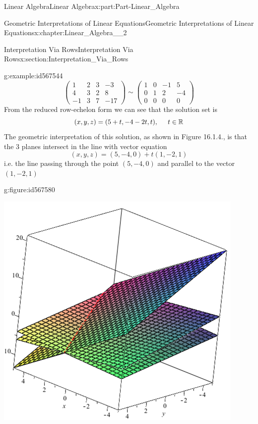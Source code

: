 \documentclass[oneside,10pt,]{book}
\numberwithin{equation}{section}
\newcommand{\amp}{&}
\begin{document}
\begin{partptx}{Linear Algebra}{}{Linear Algebra}{}{}{x:part:Part-Linear_Algebra}
\begin{chapterptx}{Geometric Interpretations of Linear Equations}{}{Geometric Interpretations of Linear Equations}{}{}{x:chapter:Linear_Algebra__2}
\begin{sectionptx}{Interpretation Via Rows}{}{Interpretation Via Rows}{}{}{x:section:Interpretation_Via_Rows}
\begin{example}{}{g:example:id567544}
\begin{equation*}
\begin{pmatrix} 1 \amp 2 \amp 3 \amp -3 \\ 4 \amp 3 \amp 2 \amp 8 \\ -1 \amp 3 \amp 7 \amp -17 \end{pmatrix} \sim \begin{pmatrix} 1 \amp 0 \amp -1 \amp 5 \\ 0 \amp 1 \amp 2 \amp -4 \\ 0 \amp 0 \amp 0 \amp 0 \end{pmatrix} 
\end{equation*}
From the reduced row-echelon form we can see that the solution set is%
\begin{equation*}
(x,y,z)=(5+t,-4-2t,t), \hspace{5mm} t\in\mathbb{R}
\end{equation*}
The geometric interpretation of this solution, as shown in Figure 16.1.4., is that the \(3\) planes intersect in the line with vector equation%
\begin{equation*}
(x,y,z)=(5,-4,0)+t(1,-2,1)
\end{equation*}
i.e. the line passing through the point \((5,-4,0)\) and parallel to the vector \((1,-2,1)\) \begin{figureptx}{}{g:figure:id567580}{}%
\begin{image}{0.2}{0.6}{0.2}%
\includegraphics[width=\linewidth]{./LinearAlgebra/Images/2/figure2.png}

\end{image}
\end{figureptx}
\end{example}
\end{sectionptx}
\end{chapterptx}
\end{partptx}
\end{document}
